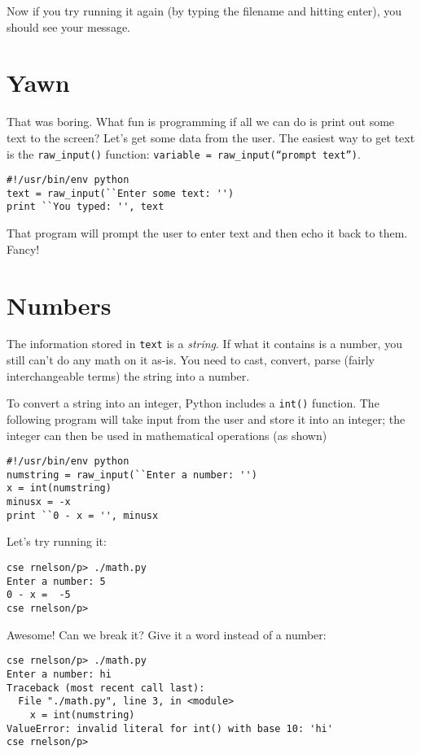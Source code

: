\documentclass[11pt, letterpaper]{article}
\begin{document}
Now if you try running it again (by typing the filename and hitting enter), you should see your message.

\section*{Yawn}

That was boring. What fun is programming if all we can do is print out some text to the screen? Let's get some data from the user. The easiest way to get text is the {\tt raw\_input()} function: {\tt variable = raw\_input(``prompt text'')}.

\begin{lstlisting}
#!/usr/bin/env python
text = raw_input(``Enter some text: '')
print ``You typed: '', text
\end{lstlisting}

That program will prompt the user to enter text and then echo it back to them. Fancy!

\section*{Numbers}

The information stored in {\tt text} is a {\em string}. If what it contains is a number, you still can't do any math on it as-is. You need to cast, convert, parse (fairly interchangeable terms) the string into a number.

To convert a string into an integer, Python includes a {\tt int()} function. The following program will take input from the user and store it into an integer; the integer can then be used in mathematical operations (as shown)

\begin{lstlisting}
#!/usr/bin/env python
numstring = raw_input(``Enter a number: '')
x = int(numstring)
minusx = -x
print ``0 - x = '', minusx
\end{lstlisting}

Let's try running it:

\begin{lstlisting}
cse rnelson/p> ./math.py 
Enter a number: 5
0 - x =  -5
cse rnelson/p>
\end{lstlisting}

Awesome! Can we break it? Give it a word instead of a number:

\begin{lstlisting}
cse rnelson/p> ./math.py
Enter a number: hi
Traceback (most recent call last):
  File "./math.py", line 3, in <module>
    x = int(numstring)
ValueError: invalid literal for int() with base 10: 'hi'
cse rnelson/p>
\end{lstlisting}
\end{document}
